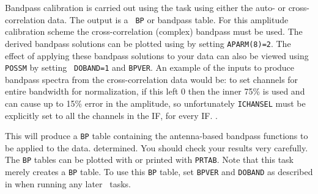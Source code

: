 Bandpass calibration is carried out using the task {\tt {}}
using either the auto- or cross-correlation data. The output is a {\tt
BP} or bandpass table.  For this amplitude calibration scheme the
cross-correlation (complex) bandpass must be used.  The derived
bandpass solutions can be plotted using {\tt {}} by setting
{\tt APARM(8)=2}.  The effect of applying these bandpass solutions to
your data can also be viewed using {\tt POSSM} by setting {\tt
DOBAND=1} and {\tt BPVER}\@.  An example of the inputs to produce
bandpass spectra from the cross-correlation data would be:
         {to set channels for entire bandwidth for normalization, if
          this left 0 then the inner 75\% is used and can cause up to
          15\% error in the amplitude, so unfortunately {\tt ICHANSEL}
          must be explicitly set to all the channels in the IF, for
          every IF.}
\@.

This will produce a {\tt BP} table containing the antenna-based
bandpass functions to be applied to the data.  determined.  You should
check your results very carefully.  The {\tt BP} tables can be plotted
with {\tt {}} or printed with {\tt PRTAB}\@.  Note that this
task merely creates a {\tt BP} table.  To use this {\tt BP} table, set
{\tt BPVER} and {\tt DOBAND} as described in  when running
any later \AIPS\ tasks.


